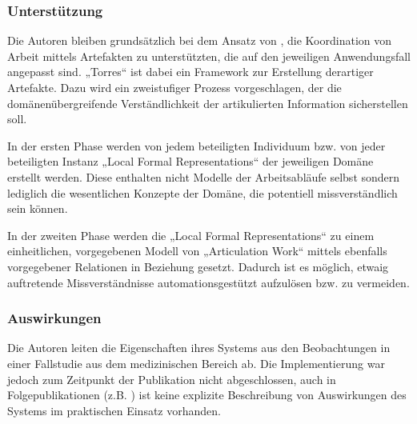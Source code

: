 \subsubsection{Unterstützung}

Die Autoren bleiben grundsätzlich bei dem Ansatz von \citet{Sarini02}, die Koordination von Arbeit mittels Artefakten zu unterstützten, die auf den jeweiligen Anwendungsfall angepasst sind. „Torres“ ist dabei ein Framework zur Erstellung derartiger Artefakte. \label{steps:cabitza} Dazu wird ein zweistufiger Prozess vorgeschlagen, der die domänenübergreifende Verständlichkeit der artikulierten Information sicherstellen soll.

In der ersten Phase werden von jedem beteiligten Individuum bzw. von jeder beteiligten Instanz „Local Formal Representations“ der jeweiligen Domäne erstellt werden. Diese enthalten nicht Modelle der Arbeitsabläufe selbst sondern lediglich die wesentlichen Konzepte der Domäne, die potentiell missverständlich sein können.

In der zweiten Phase werden die „Local Formal Representations“ zu einem einheitlichen, vorgegebenen Modell von „Articulation Work“ mittels ebenfalls vorgegebener Relationen in Beziehung gesetzt. Dadurch ist es möglich, etwaig auftretende Missverständnisse automationsgestützt aufzulösen bzw. zu vermeiden.

\subsubsection{Auswirkungen}

Die Autoren leiten die Eigenschaften ihres Systems aus den Beobachtungen in einer Fallstudie aus dem medizinischen Bereich ab. Die Implementierung war jedoch zum Zeitpunkt der Publikation nicht abgeschlossen, auch in Folgepublikationen (z.B. \citep{Cabitza09b}) ist keine explizite Beschreibung von Auswirkungen des Systems im praktischen Einsatz vorhanden.


